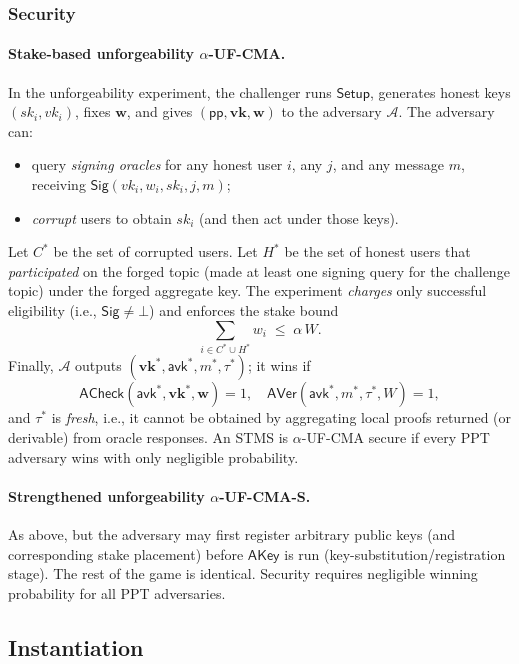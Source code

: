 \documentclass{article}
\begin{document}
\subsubsection{Security}
\paragraph{Stake-based unforgeability $\alpha$-\textsf{UF-CMA}.}
In the unforgeability experiment, the challenger runs $\mathsf{Setup}$, generates honest keys $(sk_i,vk_i)$, fixes $\mathbf{w}$, and gives $(\mathsf{pp},\mathbf{vk},\mathbf{w})$ to the adversary $\mathcal{A}$. The adversary can:
\begin{itemize}
  \item query \emph{signing oracles} for any honest user $i$, any $j$, and any message $m$, receiving $\mathsf{Sig}(vk_i,w_i,sk_i,j,m)$;
  \item \emph{corrupt} users to obtain $sk_i$ (and then act under those keys).
\end{itemize}
Let $C^\ast$ be the set of corrupted users. Let $H^\ast$ be the set of honest users that \emph{participated} on the forged topic (made at least one signing query for the challenge topic) under the forged aggregate key. The experiment \emph{charges} only successful eligibility (i.e., $\mathsf{Sig}\neq\bot$) and enforces the stake bound
\[
  \sum_{i\in C^\ast \cup H^\ast} w_i \;\le\; \alpha\, W .
\]
Finally, $\mathcal{A}$ outputs $(\mathbf{vk}^\ast,\mathsf{avk}^\ast,m^\ast,\tau^\ast)$; it wins if
\[
  \mathsf{ACheck}(\mathsf{avk}^\ast,\mathbf{vk}^\ast,\mathbf{w})=1,\quad
  \mathsf{AVer}(\mathsf{avk}^\ast,m^\ast,\tau^\ast,W)=1,
\]
and $\tau^\ast$ is \emph{fresh}, i.e., it cannot be obtained by aggregating local proofs returned (or derivable) from oracle responses. An STMS is $\alpha$-\textsf{UF-CMA} secure if every PPT adversary wins with only negligible probability.

\paragraph{Strengthened unforgeability $\alpha$-\textsf{UF-CMA-S}.}
As above, but the adversary may first register arbitrary public keys (and corresponding stake placement) before $\mathsf{AKey}$ is run (key-substitution/registration stage). The rest of the game is identical. Security requires negligible winning probability for all PPT adversaries.

\subsection{Instantiation}
\end{document}
